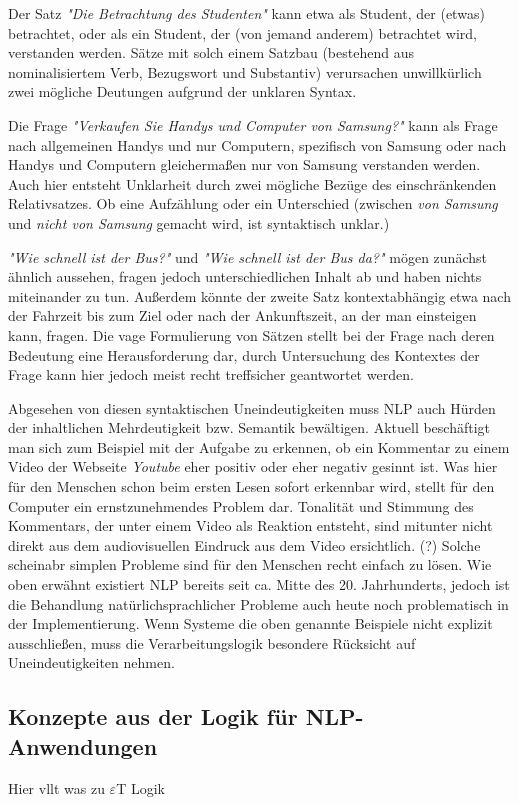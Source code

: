 \documentclass[12pt]{paper}
\begin{document}
Der Satz \textit{"Die Betrachtung des Studenten"} kann etwa als Student, der (etwas) betrachtet, oder als ein Student, der (von jemand anderem) betrachtet wird, verstanden werden. Sätze mit solch einem Satzbau (bestehend aus nominalisiertem Verb, Bezugswort und Substantiv) verursachen unwillkürlich zwei mögliche Deutungen aufgrund der unklaren Syntax.

Die Frage \textit{"Verkaufen Sie Handys und Computer von Samsung?"} kann als Frage nach allgemeinen Handys und nur Computern, spezifisch von Samsung oder nach Handys und Computern gleichermaßen nur von Samsung verstanden werden. Auch hier entsteht Unklarheit durch zwei mögliche Bezüge des einschränkenden Relativsatzes. Ob eine Aufzählung oder ein Unterschied (zwischen \textit{von Samsung} und \textit{nicht von Samsung} gemacht wird, ist syntaktisch unklar.)

\textit{"Wie schnell ist der Bus?"} und \textit{"Wie schnell ist der Bus da?"} mögen zunächst ähnlich aussehen, fragen jedoch unterschiedlichen Inhalt ab und haben nichts miteinander zu tun. Außerdem könnte der zweite Satz kontextabhängig etwa nach der Fahrzeit bis zum Ziel oder nach der Ankunftszeit, an der man einsteigen kann, fragen. Die vage Formulierung von Sätzen stellt bei der Frage nach deren Bedeutung eine Herausforderung dar, durch Untersuchung des Kontextes der Frage kann hier jedoch meist recht treffsicher geantwortet werden.

Abgesehen von diesen syntaktischen Uneindeutigkeiten muss NLP auch Hürden der inhaltlichen Mehrdeutigkeit bzw. Semantik bewältigen. Aktuell beschäftigt man sich zum Beispiel mit der Aufgabe zu erkennen, ob ein Kommentar zu einem Video der Webseite \textit{Youtube} eher positiv oder eher negativ gesinnt ist. Was hier für den Menschen schon beim ersten Lesen sofort erkennbar wird, stellt für den Computer ein ernstzunehmendes Problem dar. Tonalität und Stimmung des Kommentars, der unter einem Video als Reaktion entsteht, sind mitunter nicht direkt aus dem audiovisuellen Eindruck aus dem Video ersichtlich. (?)
Solche scheinabr simplen Probleme sind für den Menschen recht einfach zu lösen. Wie oben erwähnt existiert NLP bereits seit ca. Mitte des 20. Jahrhunderts, jedoch ist die Behandlung natürlichsprachlicher Probleme auch heute noch problematisch in der Implementierung. Wenn Systeme die oben genannte Beispiele nicht explizit ausschließen, muss die Verarbeitungslogik besondere Rücksicht auf Uneindeutigkeiten nehmen.

\subsection{Konzepte aus der Logik für NLP-Anwendungen}
Hier vllt was zu $\varepsilon$T Logik
\end{document}
